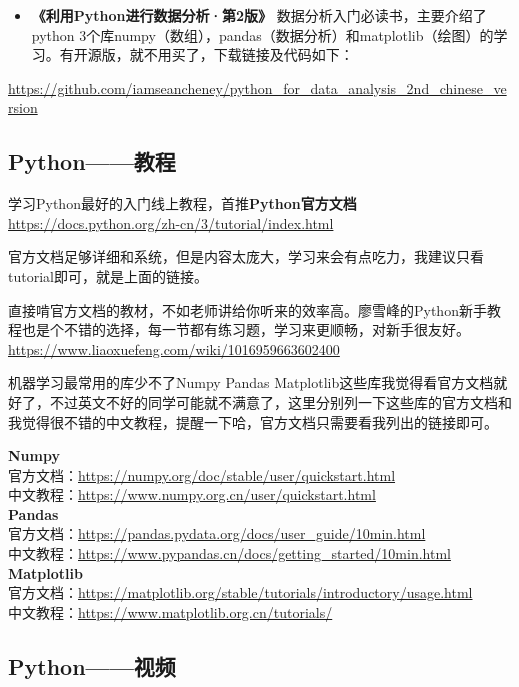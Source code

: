 \documentclass[]{ctexbook}
\providecommand{\tightlist}{%
  \setlength{\itemsep}{0pt}\setlength{\parskip}{0pt}}
\begin{document}
\begin{itemize}
\tightlist
\item
  \textbf{《利用Python进行数据分析·第2版》} 数据分析入门必读书，主要介绍了python 3个库numpy（数组），pandas（数据分析）和matplotlib（绘图）的学习。有开源版，就不用买了，下载链接及代码如下：
\end{itemize}

\url{https://github.com/iamseancheney/python_for_data_analysis_2nd_chinese_version}

\hypertarget{pythonux6559ux7a0b}{%
\subsection{Python------教程}\label{pythonux6559ux7a0b}}

学习Python最好的入门线上教程，首推\textbf{Python官方文档}\\
\url{https://docs.python.org/zh-cn/3/tutorial/index.html}

官方文档足够详细和系统，但是内容太庞大，学习来会有点吃力，我建议只看tutorial即可，就是上面的链接。

直接啃官方文档的教材，不如老师讲给你听来的效率高。廖雪峰的Python新手教程也是个不错的选择，每一节都有练习题，学习来更顺畅，对新手很友好。\\
\url{https://www.liaoxuefeng.com/wiki/1016959663602400}

机器学习最常用的库少不了Numpy Pandas Matplotlib这些库我觉得看官方文档就好了，不过英文不好的同学可能就不满意了，这里分别列一下这些库的官方文档和我觉得很不错的中文教程，提醒一下哈，官方文档只需要看我列出的链接即可。

\textbf{Numpy}\\
官方文档：\url{https://numpy.org/doc/stable/user/quickstart.html}\\
中文教程：\url{https://www.numpy.org.cn/user/quickstart.html}\\
\textbf{Pandas}\\
官方文档：\url{https://pandas.pydata.org/docs/user_guide/10min.html}\\
中文教程：\url{https://www.pypandas.cn/docs/getting_started/10min.html}\\
\textbf{Matplotlib}\\
官方文档：\url{https://matplotlib.org/stable/tutorials/introductory/usage.html}\\
中文教程：\url{https://www.matplotlib.org.cn/tutorials/}

\hypertarget{pythonux89c6ux9891}{%
\subsection{Python------视频}\label{pythonux89c6ux9891}}
\end{document}
